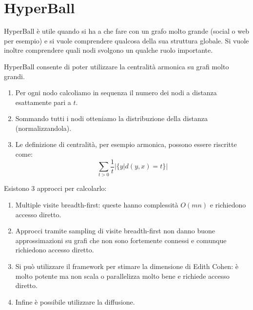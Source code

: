 \documentclass[\main/main.tex]{subfiles}
\begin{document}
\chapter{HyperBall}
\begin{multicols}{2}
\begin{observation}
    HyperBall è utile quando si ha a che fare con un grafo molto grande (social o web per esempio) e si vuole comprendere qualcosa della sua struttura globale. Si vuole inoltre comprendere quali nodi svolgono un qualche ruolo importante.
\end{observation}
\begin{observation}
    HyperBall consente di poter utilizzare la centralità armonica su grafi molto grandi.
\end{observation}
\begin{definition}
    \begin{enumerate}
        \item Per ogni nodo calcoliamo in sequenza il numero dei nodi a distanza esattamente pari a \(t\).
        \item Sommando tutti i nodi otteniamo la distribuzione della distanza (normalizzandola).
        \item Le definizione di centralità, per esempio armonica, possono essere riscritte come:
        \[
            \sum_{t>0} \frac{1}{t}|\{y | d(y, x)=t\}|
        \]
    \end{enumerate}
\end{definition}
\begin{observation}
    Esistono 3 approcci per calcolarlo:
    \begin{enumerate}
        \item Multiple visite breadth-first: queste hanno complessità \(O(mn)\) e richiedono accesso diretto.
        \item Approcci tramite sampling di visite breadth-first non danno buone approssimazioni su grafi che non sono fortemente connessi e comunque richiedono accesso diretto.
        \item Si può utilizzare il framework per stimare la dimensione di Edith Cohen: è molto potente ma non scala o parallelizza molto bene e richiede accesso diretto.
        \item Infine è possibile utilizzare la diffusione.
    \end{enumerate}
\end{observation}

\end{multicols}
\end{document}
